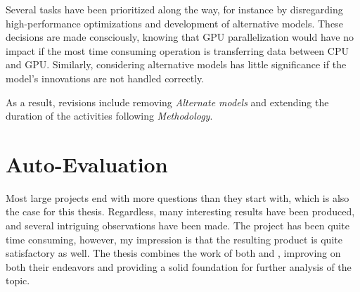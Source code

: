 \documentclass[]{article}
\begin{document}
    Several tasks have been prioritized along the way, for instance by disregarding high-performance optimizations and development of alternative models. These decisions are made consciously, knowing that GPU parallelization would have no impact if the most time consuming operation is transferring data between CPU and GPU. Similarly, considering alternative models has little significance if the model's innovations are not handled correctly.
    
    As a result, revisions include removing \emph{Alternate models} and extending the duration of the activities following \emph{Methodology}.

\section*{Auto-Evaluation}

    Most large projects end with more questions than they start with, which is also the case for this thesis. Regardless, many interesting results have been produced, and several intriguing observations have been made. The project has been quite time consuming, however, my impression is that the resulting product is quite satisfactory as well. The thesis combines the work of both \citeauthor{zangenberg2018a} and \citeauthor{jacobsen2018a}, improving on both their endeavors and providing a solid foundation for further analysis of the topic.
\end{document}

